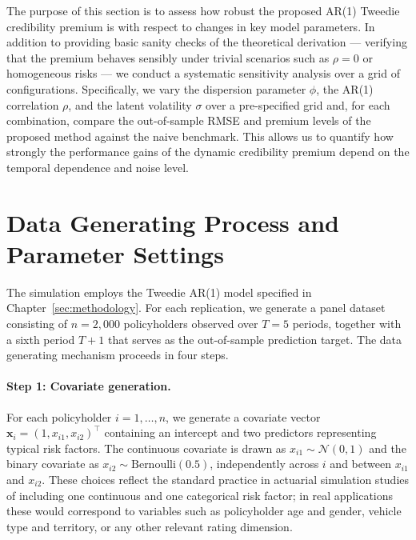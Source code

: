 \documentclass{sfuthesis}
\numberwithin{equation}{chapter}
\begin{document}
The purpose of this section is to assess how robust the proposed
AR(1) Tweedie credibility premium is with respect to changes in key
model parameters. In addition to providing basic sanity checks of the
theoretical derivation --- verifying that the premium behaves sensibly
under trivial scenarios such as $\rho = 0$ or homogeneous risks --- we
conduct a systematic sensitivity analysis over a grid of
configurations. Specifically, we vary the dispersion parameter
$\phi$, the AR(1) correlation $\rho$, and the latent volatility
$\sigma$ over a pre-specified grid and, for each combination, compare
the out-of-sample RMSE and premium levels of the proposed method
against the naive benchmark. This allows us to quantify how strongly
the performance gains of the dynamic credibility premium depend on the
temporal dependence and noise level.

\section{Data Generating Process and Parameter Settings}
The simulation employs the Tweedie AR(1) model specified in Chapter~\ref{sec:methodology}. For each replication, we generate a panel dataset consisting of $n = 2{,}000$ policyholders observed over $T = 5$ periods, together with a sixth period $T+1$ that serves as the out-of-sample prediction target. The data generating mechanism proceeds in four steps.

\paragraph{Step 1: Covariate generation.}
For each policyholder $i = 1, \dots, n$, we generate a covariate vector $\bm{x}_i = (1, x_{i1}, x_{i2})^\top$ containing an intercept and two predictors representing typical risk factors. The continuous covariate is drawn as $x_{i1} \sim \mathcal{N}(0, 1)$ and the binary covariate as $x_{i2} \sim \text{Bernoulli}(0.5)$, independently across $i$ and between $x_{i1}$ and $x_{i2}$. These choices reflect the standard practice in actuarial simulation studies of including one continuous and one categorical risk factor; in real applications these would correspond to variables such as policyholder age and gender, vehicle type and territory, or any other relevant rating dimension.
\end{document}
